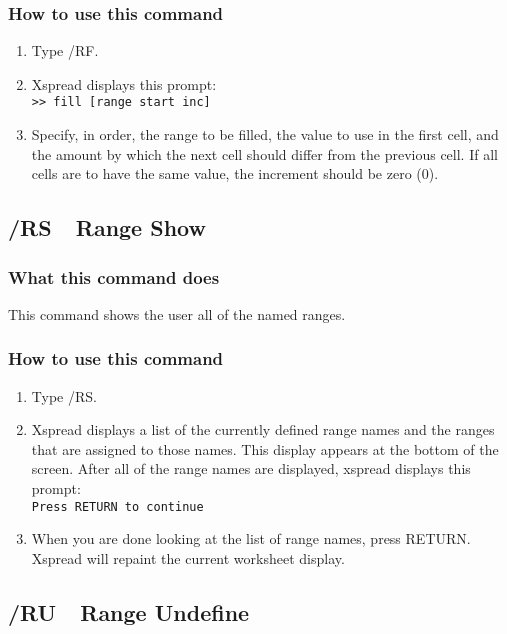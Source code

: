 \subsubsection*{How to use this command}
\begin{enumerate}
\item{Type /RF.}
\item{Xspread displays this prompt:\\
        {\tt >> fill [range start inc]}  }
\item{Specify, in order, the range to be filled, the value to use in the
        first cell, and the amount by which the next cell should differ
        from the previous cell.  If all cells are to have the same value,
        the increment should be zero (0).}
\end{enumerate}
        
\subsection*{/RS\ \      Range Show}

\subsubsection*{What this command does}
This command shows the user all of the named ranges.

\subsubsection*{How to use this command}
\begin{enumerate}
\item{Type /RS.}
\item{Xspread displays a list of the currently defined range names and
        the ranges that are assigned to those names.  This display appears
        at the bottom of the screen.  After all of the range names are
        displayed, xspread displays this prompt: \\
        {\tt Press RETURN to continue} }
\item{When you are done looking at the list of range names, press
        RETURN.  Xspread will repaint the current worksheet display.}
\end{enumerate}
        
\subsection*{/RU\ \      Range Undefine}


